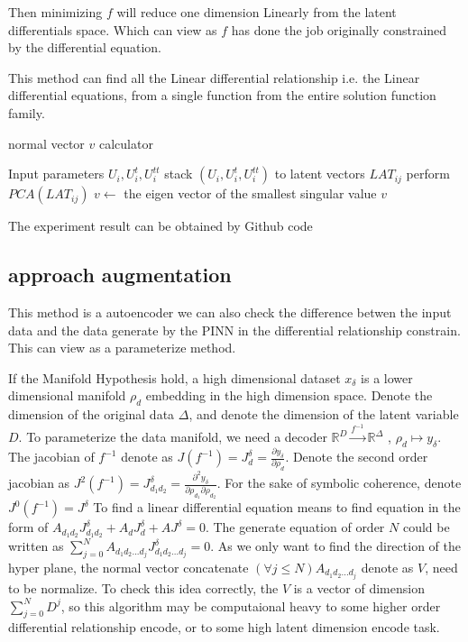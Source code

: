 \documentclass{article}
\begin{document}
Then minimizing $f$ will reduce one dimension Linearly
from the latent differentials space. Which can view as $f$ has
done the job originally constrained by the differential equation.

This method can find all the Linear differential relationship
i.e. the Linear differential equations,
from a single function from the entire solution function family.
\begin{algorithm}
    \caption{normal vector $v$ calculator}\label{algor:2}
    \begin{algorithmic}[1]
        \REQUIRE Input parameters $U_i, U^{t}_{i}, U^{tt}_{i}$
        \STATE stack $(U_i,U^{t}_{i},U^{tt}_{i})$ to latent vectors $LAT_{ij}$
        \STATE perform $PCA(LAT_{ij})$
        \STATE $v \leftarrow$ the eigen vector of the smallest singular value
        \RETURN $v$
    \end{algorithmic}
\end{algorithm}

The experiment result can be obtained by Github
code \cite[deLinearTasksSine]{deLinearTasksSine}

\subsection{approach augmentation}
This method is a autoencoder we can also check the difference
betwen the input data and the data generate by the PINN in the
differential relationship constrain. This can view as a parameterize method.

If the Manifold Hypothesis hold, a high dimensional
dataset $x_\delta$ is a lower dimensional manifold $\rho_d$ embedding in
the high dimension space. Denote the dimension of the
original data $\Delta$, and denote the dimension of the
latent variable $D$. To parameterize the data manifold,
we need a decoder $\mathbb{R}^{D} \xrightarrow{f^{-1}} \mathbb{R}^{\Delta}$
, ${\rho}_d \mapsto y_\delta$. The jacobian of ${f^{-1}}$
denote as $J({f^{-1}})=J^\delta_d=\frac{\partial y_\delta}{\partial \rho_d}$.
Denote the second order jacobian as
$J^2({f^{-1}})=J^\delta_{d_1 d_2}=\frac{\partial^2 y_\delta}{\partial \rho_{d_1}\partial \rho_{d_2}}$.
For the sake of symbolic coherence, denote
$J^0({f^{-1}})=J^\delta$
To find a linear differential equation means to find
equation in the form of
$A_{d_1 d_2}J^\delta_{d_1 d_2}+A_{d}J^\delta_d+AJ^\delta=0$. The generate
equation of order $N$ could be written as
$\sum_{j=0}^{N} A_{d_1 d_2 ... d_j}J^\delta_{d_1 d_2 ... d_j}=0$.
As we only want to find the direction of the hyper plane,
the normal vector concatenate $(\forall j\leq N)A_{d_1 d_2 ... d_j}$
denote as $V$, need to be normalize. To check this idea correctly, the $V$ is a
vector of dimension $\sum_{j=0}^{N} D^{j}$, so this algorithm
may be computaional heavy to some higher order differential
relationship encode, or to some high latent dimension encode task.
\end{document}
